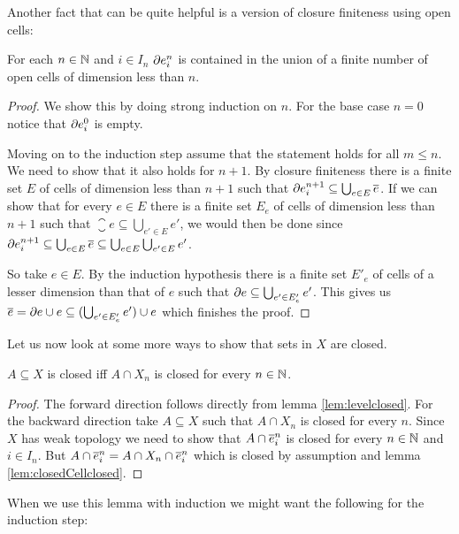 Another fact that can be quite helpful is a version of closure finiteness using open cells:

\begin{lem}
    For each $n \in \bN$ and $i \in I_n$ $\cellFrontier{n}{i}$ is contained in the union of a finite number of open cells of dimension less than $n$.
\end{lem}
\begin{proof}
    We show this by doing strong induction on $n$.
    For the base case $n = 0$ notice that $\cellFrontier{0}{i}$ is empty.

    Moving on to the induction step assume that the statement holds for all $m \le n$.
    We need to show that it also holds for $n + 1$.
    By closure finiteness there is a finite set $E$ of cells of dimension less than $n + 1$ such that $\cellFrontier{n + 1}{i} \subseteq \bigcup_{e \in E}\closure{e}$.
    If we can show that for every $e \in E$ there is a finite set $E_e$ of cells of dimension less than $n + 1$ such that $\closure{e} \subseteq \bigcup_{e' \in E}e'$, we would then be done since $\cellFrontier{n + 1}{i} \subseteq \bigcup_{e \in E}\closure{e} \subseteq \bigcup_{e \in E}\bigcup_{e' \in E}e'$.

    So take $e \in E$.
    By the induction hypothesis there is a finite set $E'_e$ of cells of a lesser dimension than that of $e$ such that $\boundary e \subseteq \bigcup_{e' \in E'_e}e'$.
    This gives us $\closure e = \boundary e \cup e \subseteq (\bigcup_{e' \in E'_e}e') \cup e$ which finishes the proof.
\end{proof}

Let us now look at some more ways to show that sets in $X$ are closed. 

\begin{lem}\label{lem:closediffskeleton}
    $A \subseteq X$ is closed iff $A \cap X_n$ is closed for every $n \in \bN$.
\end{lem}
\begin{proof}
    The forward direction follows directly from lemma \ref{lem:levelclosed}. 
    For the backward direction take $A \subseteq X$ such that $A \cap X_n$ is closed for every $n$.
    Since $X$ has weak topology we need to show that $A \cap \closedCell{n}{i}$ is closed for every $n \in \bN$ and $i \in I_n$. 
    But $A \cap \closedCell{n}{i} = A \cap X_n \cap \closedCell{n}{i}$ which is closed by assumption and lemma \ref{lem:closedCellclosed}.
\end{proof}

When we use this lemma with induction we might want the following for the induction step:

